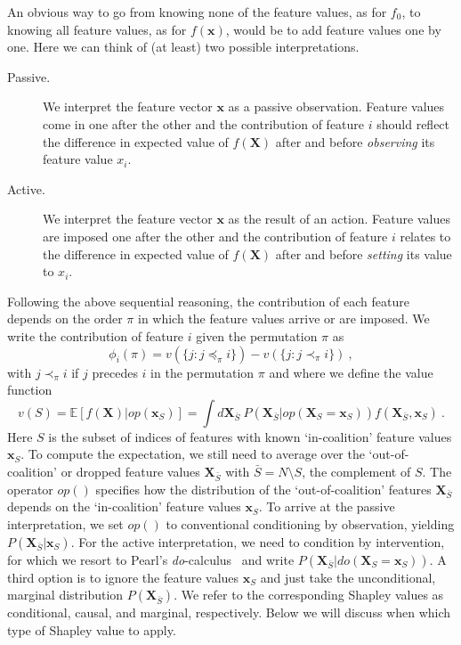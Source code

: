 \documentclass{article}
\newcommand{\vX}{\mathbf{X}}
\newcommand{\vx}{\mathbf{x}}
\newcommand{\expectation}{\mathbb{E}}
\newcommand{\contribution}{{\phi}}
\newcommand{\val}{{v}}
\newcommand{\dodo}{\mathit{do}}
\newcommand{\lvdo}[1]{\dodo(\vX_{#1} = \vx_{#1})}
\newcommand{\perm}{\pi}
\newcommand{\operator}{\mathit{op}}
\newcommand{\svop}[1]{\operator(\vx_{#1})}
\newcommand{\lvop}[1]{\operator(\vX_{#1} = \vx_{#1})}
\newcommand{\allfeatures}{{N}}
\begin{document}
An obvious way to go from knowing none of the feature values, as for $f_0$, to knowing all feature values, as for $f(\vx)$, would be to add feature values one by one. Here we can think of (at least) two possible interpretations.
\begin{description}
	\item[Passive.] We interpret the feature vector $\vx$ as a passive observation. Feature values come in one after the other and the contribution of feature $i$ should reflect the difference in expected value of $f(\vX)$ after and before {\em observing} its feature value $x_i$.
	\item[Active.] We interpret the feature vector $\vx$ as the result of an action. Feature values are imposed one after the other and the contribution of feature $i$ relates to the difference in expected value of $f(\vX)$ after and before {\em setting} its value to $x_i$.
\end{description}
Following the above sequential reasoning, the contribution of each feature depends on the order $\perm$ in which the feature values arrive or are imposed. We write the contribution of feature $i$ given the permutation $\perm$ as
\begin{equation}
\contribution_i(\perm) = \val(\{j: j \preceq_\perm i\}) - \val(\{j: j \prec_\perm i\}) \: ,
\label{eq:contperm}
\end{equation}
with $j \prec_\perm i$ if $j$ precedes $i$ in the permutation $\perm$ and where we define the value function
\begin{equation}
\val(S) = \expectation \left[f(\vX) | \svop{S} \right] = \int d\vX_{\bar{S}} \: P(\vX_{\bar{S}}|\lvop{S}) f(\vX_{\bar{S}},\vx_S) \: .
\label{eq:valuedef}
\end{equation}
Here $S$ is the subset of indices of features with known `in-coalition' feature values $\vx_S$. To compute the expectation, we still need to average over the `out-of-coalition' or dropped feature values $\vX_{\bar{S}}$ with $\bar{S} = \allfeatures \setminus S$, the complement of $S$. The operator $\operator()$ specifies how the distribution of the `out-of-coalition' features $\vX_{\bar{S}}$ depends on the `in-coalition' feature values $\vx_{S}$. To arrive at the passive interpretation, we set $\operator()$ to conventional conditioning by observation, yielding $P(\vX_{\bar{S}}|\vx_{S})$. For the active interpretation, we need to condition by intervention, for which we resort to Pearl's \textit{do}-calculus~\cite{pearl1995causal} and write $P(\vX_{\bar{S}}|\lvdo{S})$. A third option is to ignore the feature values $\vx_S$ and just take the unconditional, marginal distribution $P(\vX_{\bar{S}})$. We refer to the corresponding Shapley values as conditional, causal, and marginal, respectively. Below we will discuss when which type of Shapley value to apply.
\end{document}
